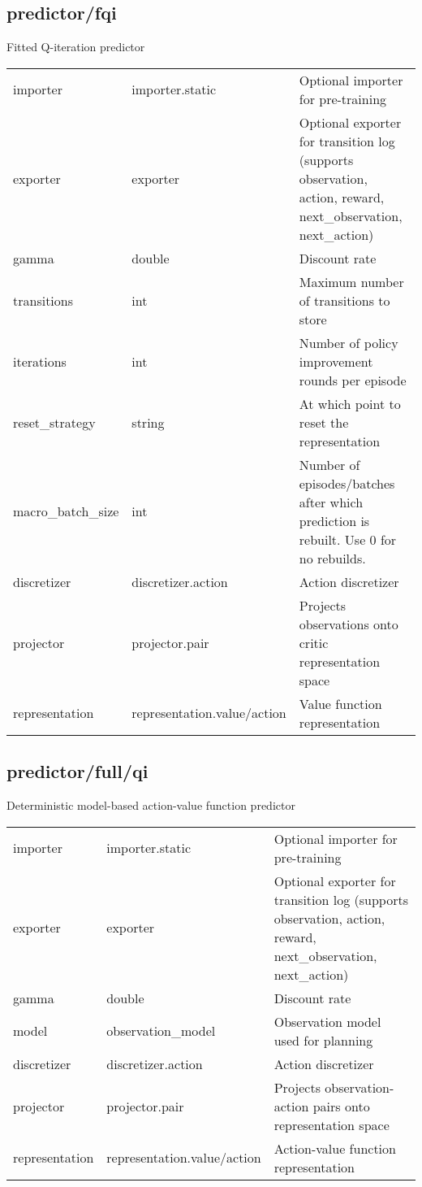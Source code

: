 \subsection{predictor/fqi}
\noindent Fitted Q-iteration predictor\\

\noindent\begin{tabular}{@{}lll@{}}
importer&importer.static&Optional importer for pre-training\\
exporter&exporter&Optional exporter for transition log (supports observation, action, reward, next\_observation, next\_action)\\
gamma&double&Discount rate\\
transitions&int&Maximum number of transitions to store\\
iterations&int&Number of policy improvement rounds per episode\\
reset\_strategy&string&At which point to reset the representation\\
macro\_batch\_size&int&Number of episodes/batches after which prediction is rebuilt. Use 0 for no rebuilds.\\
discretizer&discretizer.action&Action discretizer\\
projector&projector.pair&Projects observations onto critic representation space\\
representation&representation.value/action&Value function representation\\
\end{tabular}
\subsection{predictor/full/qi}
\noindent Deterministic model-based action-value function predictor\\

\noindent\begin{tabular}{@{}lll@{}}
importer&importer.static&Optional importer for pre-training\\
exporter&exporter&Optional exporter for transition log (supports observation, action, reward, next\_observation, next\_action)\\
gamma&double&Discount rate\\
model&observation\_model&Observation model used for planning\\
discretizer&discretizer.action&Action discretizer\\
projector&projector.pair&Projects observation-action pairs onto representation space\\
representation&representation.value/action&Action-value function representation\\
\end{tabular}
